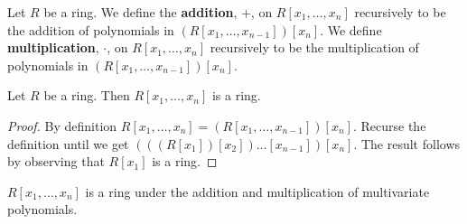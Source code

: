 \begin{definition}
  Let $R$ be a ring. We define the \textbf{addition}, $+$, on
  $R[x_1, \dots, x_n]$ recursively to be the addition of polynomials
  in $(R[x_1, \dots, x_{n-1}])[x_n]$. We define
  \textbf{multiplication}, $\cdot$, on $R[x_1, \dots, x_n]$ recursively
  to be the multiplication of polynomials in $(R[x_1, \dots,
  x_{n-1}])[x_n]$.
\end{definition}

\begin{proposition}\label{proposition_7.1.2}
  Let $R$ be a ring. Then  $R[x_1, \dots, x_n]$ is a ring.
\end{proposition}
\begin{proof}
  By definition $R[x_1, \dots, x_n]=(R[x_1, \dots, x_{n-1}])[x_n]$.
  Recurse the definition until we get $(((R[x_1])[x_2]) \dots
  [x_{n-1}])[x_n]$. The result follows by observing that $R[x_1]$ is a
  ring.
\end{proof}
\begin{corollary}
  $R[x_1, \dots, x_n]$ is a ring under the addition and multiplication
  of multivariate polynomials.
\end{corollary}

